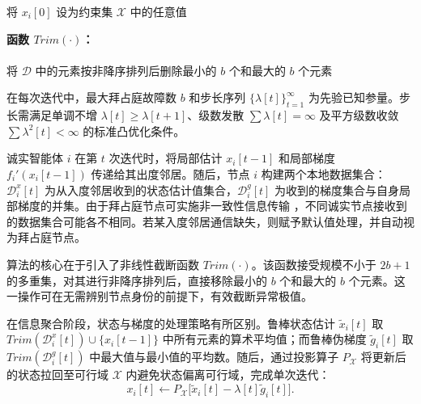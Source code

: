 \documentclass[12pt,hyperref,a4paper,UTF8]{ctexart}
\numberwithin{equation}{section}
\numberwithin{figure}{section}
\numberwithin{table}{section}
\begin{document}
\begin{algorithm}[H]
    将 $x_i[0]$ 设为约束集 $\mathcal{X}$ 中的任意值\;
    \caption{拜占庭容错梯度下降（诚实智能体 $i\in\mathcal{V}\setminus\mathcal{A}$ 的本地程序）}
    \label{alg:1}
    \noindent\textbf{函数 $Trim(\cdot)$：} \\
     \\
    将 $\mathcal{D}$ 中的元素按非降序排列后删除最小的 $b$ 个和最大的 $b$ 个元素 \\
\end{algorithm}

在每次迭代中，最大拜占庭故障数 $b$ 和步长序列 $\{\lambda[t]\}_{t=1}^{\infty}$ 为先验已知参量。步长需满足单调不增 $\lambda[t] \ge \lambda[t+1]$、级数发散 $\sum \lambda[t] = \infty$ 及平方级数收敛 $\sum \lambda^2[t] < \infty$ 的标准凸优化条件。

诚实智能体 $i$ 在第 $t$ 次迭代时，将局部估计 $x_i[t-1]$ 和局部梯度 $f_i'(x_i[t-1])$ 传递给其出度邻居。随后，节点 $i$ 构建两个本地数据集合：$\mathcal{D}_i^x[t]$ 为从入度邻居收到的状态估计值集合，$\mathcal{D}_i^g[t]$ 为收到的梯度集合与自身局部梯度的并集。由于拜占庭节点可实施非一致性信息传输 \cite{fischer1985impossibility}，不同诚实节点接收到的数据集合可能各不相同。若某入度邻居通信缺失，则赋予默认值处理，并自动视为拜占庭节点。

算法的核心在于引入了非线性截断函数 $Trim(\cdot)$。该函数接受规模不小于 $2b+1$ 的多重集，对其进行非降序排列后，直接移除最小的 $b$ 个和最大的 $b$ 个元素。这一操作可在无需辨别节点身份的前提下，有效截断异常极值。

在信息聚合阶段，状态与梯度的处理策略有所区别。鲁棒状态估计 $\widetilde{x}_i[t]$ 取 $Trim(\mathcal{D}_i^x[t]) \cup \{x_i[t-1]\}$ 中所有元素的算术平均值；而鲁棒伪梯度 $\widetilde{g}_i[t]$ 取 $Trim(\mathcal{D}_i^g[t])$ 中最大值与最小值的平均数。随后，通过投影算子 $P_{\mathcal{X}}$ 将更新后的状态拉回至可行域 $\mathcal{X}$ 内避免状态偏离可行域，完成单次迭代：
\begin{equation}
    x_i[t] \leftarrow P_{\mathcal{X}}\bigl[\widetilde{x}_i[t] - \lambda[t]\widetilde{g}_i[t]\bigr].
    \label{eq:update}
\end{equation}
\end{document}

